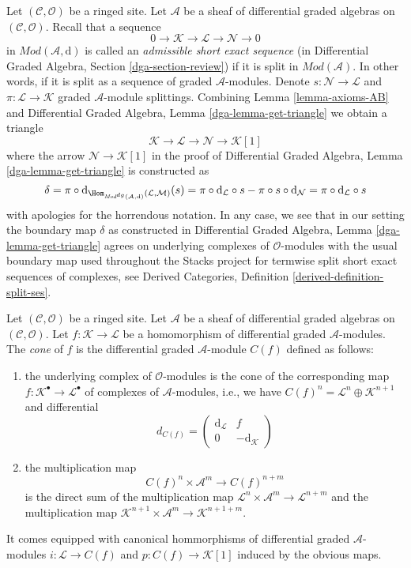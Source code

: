 \noindent
Let $(\mathcal{C}, \mathcal{O})$ be a ringed site.
Let $\mathcal{A}$ be a sheaf of differential graded algebras
on $(\mathcal{C}, \mathcal{O})$.
Recall that a sequence
$$
0 \to \mathcal{K} \to \mathcal{L} \to \mathcal{N} \to 0
$$
in $\textit{Mod}(\mathcal{A}, \text{d})$
is called an {\it admissible short exact sequence}
(in Differential Graded Algebra, Section \ref{dga-section-review})
if it is split in $\textit{Mod}(\mathcal{A})$. In other words, if it is split
as a sequence of graded $\mathcal{A}$-modules. Denote
$s : \mathcal{N} \to \mathcal{L}$ and
$\pi : \mathcal{L} \to \mathcal{K}$
graded $\mathcal{A}$-module splittings.
Combining Lemma \ref{lemma-axioms-AB} and 
Differential Graded Algebra, Lemma \ref{dga-lemma-get-triangle}
we obtain a triangle
$$
\mathcal{K} \to \mathcal{L} \to \mathcal{N} \to \mathcal{K}[1]
$$
where the arrow $\mathcal{N} \to \mathcal{K}[1]$ in the proof
of Differential Graded Algebra, Lemma \ref{dga-lemma-get-triangle}
is constructed as
$$
\delta = \pi \circ
\text{d}_{\Hom_{\textit{Mod}^{dg}(\mathcal{A}, \text{d})}
(\mathcal{L}, \mathcal{M})}(s) =
\pi \circ \text{d}_\mathcal{L} \circ s -
\pi \circ s \circ \text{d}_\mathcal{N} =
\pi \circ \text{d}_\mathcal{L} \circ s
$$
with apologies for the horrendous notation. In any case, we see that
in our setting the boundary map $\delta$ as constructed in
Differential Graded Algebra, Lemma \ref{dga-lemma-get-triangle}
agrees on underlying complexes of $\mathcal{O}$-modules
with the usual boundary map used throughout the Stacks project
for termwise split short exact sequences of complexes, see
Derived Categories, Definition \ref{derived-definition-split-ses}.

\begin{definition}
\label{definition-cone}
Let $(\mathcal{C}, \mathcal{O})$ be a ringed site.
Let $\mathcal{A}$ be a sheaf of differential graded algebras
on $(\mathcal{C}, \mathcal{O})$.
Let $f : \mathcal{K} \to \mathcal{L}$
be a homomorphism of differential graded $\mathcal{A}$-modules.
The {\it cone} of $f$ is the differential graded $\mathcal{A}$-module
$C(f)$ defined as follows:
\begin{enumerate}
\item the underlying complex of $\mathcal{O}$-modules
is the cone of the corresponding map
$f : \mathcal{K}^\bullet \to \mathcal{L}^\bullet$ of
complexes of $\mathcal{A}$-modules, i.e., we have
$C(f)^n = \mathcal{L}^n \oplus \mathcal{K}^{n + 1}$ and
differential
$$
d_{C(f)} =
\left(
\begin{matrix}
\text{d}_\mathcal{L} & f \\
0 & -\text{d}_\mathcal{K}
\end{matrix}
\right)
$$
\item the multiplication map
$$
C(f)^n \times \mathcal{A}^m \to C(f)^{n + m}
$$
is the direct sum of the multiplication map
$\mathcal{L}^n \times \mathcal{A}^m \to \mathcal{L}^{n + m}$
and the multiplication map
$\mathcal{K}^{n + 1} \times \mathcal{A}^m \to \mathcal{K}^{n + 1 + m}$.
\end{enumerate}
It comes equipped with canonical hommorphisms of differential graded
$\mathcal{A}$-modules $i : \mathcal{L} \to C(f)$
and $p : C(f) \to \mathcal{K}[1]$ induced by the obvious maps.
\end{definition}

